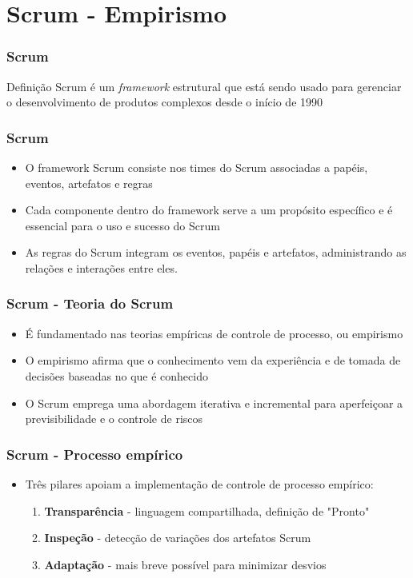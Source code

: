 \section{Scrum - Empirismo}
\begin{frame}
 \frametitle{Scrum}
 \begin{block}{Definição}
  Scrum é um \textit{framework} estrutural que está sendo usado para gerenciar o desenvolvimento de
produtos complexos desde o início de 1990
 \end{block}
\end{frame}

 \begin{frame}
 \frametitle{Scrum}
  \begin{itemize}
   \item O framework Scrum consiste nos times do Scrum associadas a papéis, eventos, artefatos e
regras 
\item Cada componente dentro do framework serve a um propósito específico e é essencial
para o uso e sucesso do Scrum
\item As regras do Scrum integram os eventos, papéis e artefatos, administrando as relações e
interações entre eles.
  \end{itemize}
 \end{frame}
 


\begin{frame}
 \frametitle{Scrum - Teoria do Scrum}
 \begin{itemize}
  \item É fundamentado nas teorias empíricas de controle de processo, ou empirismo
  \item O empirismo afirma que o conhecimento vem da experiência e de tomada de
decisões baseadas no que é conhecido
\item O Scrum emprega uma abordagem iterativa e
incremental para aperfeiçoar a previsibilidade e o controle de riscos
 \end{itemize}
\end{frame} 


\begin{frame}
 \frametitle{Scrum - Processo empírico}
 \begin{itemize}
  \item Três pilares apoiam a implementação de controle de processo empírico:
  \begin{enumerate}
   \item \textbf{Transparência} - linguagem compartilhada, definição de "Pronto"
   \item \textbf{Inspeção} - detecção de variações dos artefatos Scrum
   \item \textbf{Adaptação} - mais breve possível para minimizar desvios
  \end{enumerate}
 \end{itemize}
\end{frame} 


